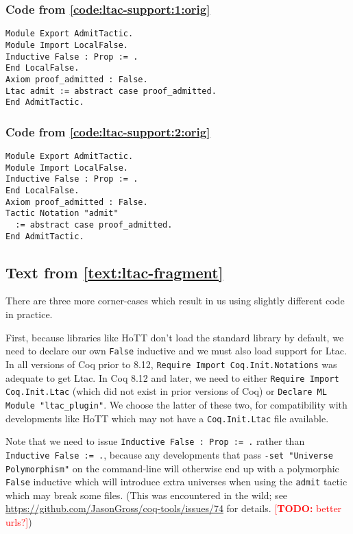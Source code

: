 \documentclass[a4paper,USenglish,cleveref,autoref,thm-restate]{lipics-v2021}
\makeatletter
\newcommand{\todo}[1]{%
\@latex@warning{TODO: \detokenize{#1} on page \thepage}%
\textcolor{red}{[\textbf{TODO:} #1]}}%
\makeatother
\begin{document}
\subsubsection{Code from \autoref{code:ltac-support:1:orig}}\label{code:ltac-support:1}
\begin{verbatim}
Module Export AdmitTactic.
Module Import LocalFalse.
Inductive False : Prop := .
End LocalFalse.
Axiom proof_admitted : False.
Ltac admit := abstract case proof_admitted.
End AdmitTactic.
\end{verbatim}
\subsubsection{Code from \autoref{code:ltac-support:2:orig}}\label{code:ltac-support:2}
\begin{verbatim}
Module Export AdmitTactic.
Module Import LocalFalse.
Inductive False : Prop := .
End LocalFalse.
Axiom proof_admitted : False.
Tactic Notation "admit"
  := abstract case proof_admitted.
End AdmitTactic.
\end{verbatim}


\subsection{Text from \autoref{text:ltac-fragment}}\label{text:ltac-fragment}
There are three more corner-cases which result in us using slightly different code in practice.

First, because libraries like HoTT don't load the standard library by default, we need to declare our own \verb|False| inductive and we must also load support for Ltac.
In all versions of Coq prior to 8.12, \verb|Require Import Coq.Init.Notations| was adequate to get Ltac.
In Coq 8.12 and later, we need to either \verb|Require Import Coq.Init.Ltac| (which did not exist in prior versions of Coq) or \verb|Declare ML Module "ltac_plugin"|.
We choose the latter of these two, for compatibility with developments like HoTT which may not have a \verb|Coq.Init.Ltac| file available.

Note that we need to issue \verb|Inductive False : Prop := .| rather than \verb|Inductive False := .|, because any developments that pass \verb|-set "Universe Polymorphism"| on the command-line will otherwise end up with a polymorphic \verb|False| inductive which will introduce extra universes when using the \verb|admit| tactic which may break some files.
(This was encountered in the wild; see \url{https://github.com/JasonGross/coq-tools/issues/74} for details.\todo{better urls?})
\end{document}
